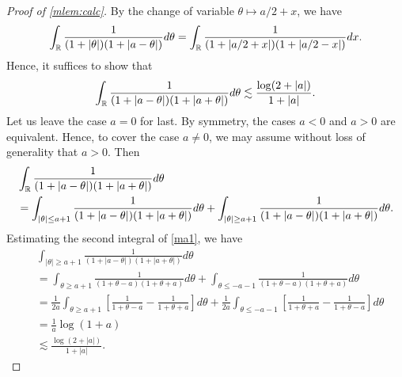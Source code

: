 \begin{proof}[Proof of \cref{mlem:calc}]
%
%
%
By the change of variable $\theta \mapsto a/2 + x$, we have
%
%
\begin{equation*}
	\begin{split}
		\int_{\mathbb{R}} \frac{1}{(1 + | \theta |)(1 + | a - \theta |)}d \theta
	= \int_{\mathbb{R}} \frac{1}{(1 + |  a/2 + x |)(1 + | a/2 - x |)}d x.
	\end{split}
\end{equation*}
%
%
Hence, it suffices to show that
%
%
\begin{equation*}
	\begin{split}
		\int_{\mathbb{R}} \frac{1}{(1 + | a - \theta |)(1 + | a + \theta |)}d \theta
		\lesssim \frac{\log(2 + | a |)}{1 + | a |}.
	\end{split}
\end{equation*}
%
%
Let us leave the case $a = 0$ for last. By symmetry, the cases $a<0$ and $a >0$
are equivalent. Hence, to cover the case $a \neq0$, we may assume
without loss of generality that $a >0$.
%
%
Then
\begin{equation}
	\label{ma1}
	\begin{split}
		& \int_{\mathbb{R}} \frac{1}{(1 + | a - \theta |)(1 + | a + \theta |)}d \theta
		\\
		& = \int_{| \theta| \le a+1 } \frac{1}{(1 + | a - \theta |)(1 + | a + \theta
		|)}d \theta + \int_{| \theta| \ge a+1 } \frac{1}{(1 + | a - \theta |)(1 + |
		a + \theta |)}d \theta.
	\end{split}
\end{equation}
Estimating the second integral of \eqref{ma1}, we have
\begin{equation*}
	\begin{split}
		& \int_{| \theta| \ge a+1 } \frac{1}{(1 + | a - \theta |)(1 + | a + \theta
		|)}d \theta 
		\\
		& = \int_{\theta \ge a + 1} \frac{1}{(1 + \theta-a)(1 + \theta+a)} d \theta
		+ \int_{\theta \le -a -1} \frac{1}{(1 + \theta - a) (1 + \theta + a)}d \theta
		\\
		& = \frac{1}{2a} \int_{\theta \ge a + 1} \left[ \frac{1}{1 + \theta -a} -
		\frac{1}{1 + \theta+a} \right] d \theta
		+ \frac{1}{2a} \int_{\theta \le -a-1} \left[ \frac{1}{1 + \theta+a}
		-\frac{1}{1 + \theta -a} \right] d \theta
		\\
		& = \frac{1}{a} \log(1+a)
		\\
		& \lesssim \frac{\log(2 + |a|)}{1 + | a |}.
	\end{split}
\end{equation*}

\end{proof}
